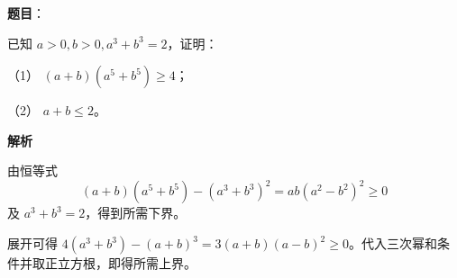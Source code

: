 \begin{answer}

\textbf{题目}：

已知 \(a>0,b>0,a^3+b^3=2\)，证明：

（1） \((a+b)(a^5+b^5)\ge4\)；

（2） \(a+b\le2\)。

\textbf{解析}


由恒等式
\nopagebreak[4]
\[
(a+b)(a^5+b^5)-(a^3+b^3)^2=ab(a^2-b^2)^2\ge0
\]
及 \(a^3+b^3=2\)，得到所需下界。


展开可得 \(4(a^3+b^3)-(a+b)^3=3(a+b)(a-b)^2\ge0\)。代入三次幂和条件并取正立方根，即得所需上界。



\end{answer}